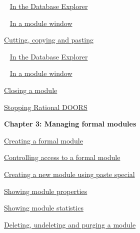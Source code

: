 \documentclass[11pt,a4paper]{article}
\begin{document}
\,\,\, \href{https://www.ibm.com/support/knowledgecenter/search/In%20the%20Database%20Explorer?scope=SSYQBZ_9.6.1}{In the Database Explorer}

\,\,\, \href{https://www.ibm.com/support/knowledgecenter/search/In%20a%20module%20window?scope=SSYQBZ_9.6.1}{In a module window}

\href{https://www.ibm.com/support/knowledgecenter/search/Cutting,%20copying%20and%20pasting?scope=SSYQBZ_9.6.1}{Cutting, copying and pasting}

\,\,\, \href{https://www.ibm.com/support/knowledgecenter/search/In%20the%20Database%20Explorer?scope=SSYQBZ_9.6.1}{In the Database Explorer}

\,\,\, \href{https://www.ibm.com/support/knowledgecenter/search/In%20a%20module%20window?scope=SSYQBZ_9.6.1}{In a module window}

\href{https://www.ibm.com/support/knowledgecenter/search/Closing%20a%20module?scope=SSYQBZ_9.6.1}{Closing a module}

\href{https://www.ibm.com/support/knowledgecenter/search/Stopping%20Rational%20DOORS?scope=SSYQBZ_9.6.1}{Stopping Rational DOORS} \\



\begin{Large}\textbf{Chapter 3: Managing formal modules} \end{Large} 
\vspace{1mm}

\href{https://www.ibm.com/support/knowledgecenter/search/Creating%20a%20formal%20module?scope=SSYQBZ_9.6.1}{Creating a formal module}

\href{https://www.ibm.com/support/knowledgecenter/search/Controlling%20access%20to%20a%20formal%20module?scope=SSYQBZ_9.6.1}{Controlling access to a formal module}

\href{https://www.ibm.com/support/knowledgecenter/search/Creating%20a%20new%20module%20using%20paste%20special?scope=SSYQBZ_9.6.1}{Creating a new module using paste special}

\href{https://www.ibm.com/support/knowledgecenter/search/Showing%20module%20properties?scope=SSYQBZ_9.6.1}{Showing module properties}

\href{https://www.ibm.com/support/knowledgecenter/search/Showing%20module%20statistics?scope=SSYQBZ_9.6.1}{Showing module statistics}

\href{https://www.ibm.com/support/knowledgecenter/search/Deleting,%20undeleting%20and%20purging%20a%20module?scope=SSYQBZ_9.6.1}{Deleting, undeleting and purging a module}
\end{document}
